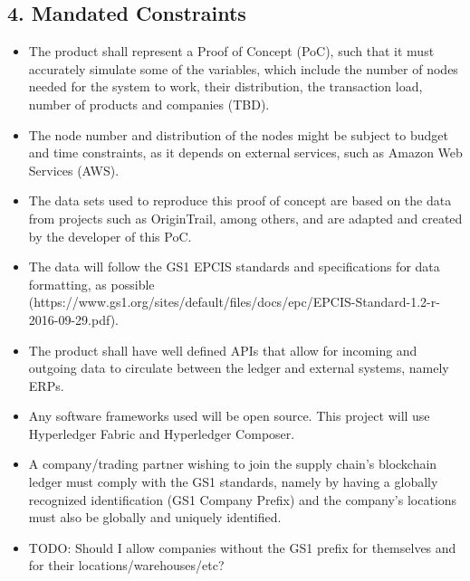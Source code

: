 \subsection*{4. Mandated Constraints}
    \begin{itemize}
		\item The product shall represent a Proof of Concept (PoC), such that it must accurately simulate some of the variables, which include the number of nodes needed for the system to work, their distribution, the transaction load, number of products and companies (TBD).
		\item The node number and distribution of the nodes might be subject to budget and time constraints, as it depends on external services, such as Amazon Web Services (AWS).
		\item The data sets used to reproduce this proof of concept are based on the data from projects such as OriginTrail, among others, and are adapted and created by the developer of this PoC.
		\item The data will follow the GS1 EPCIS standards and specifications for data formatting, as possible (https://www.gs1.org/sites/default/files/docs/epc/EPCIS-Standard-1.2-r-2016-09-29.pdf).
		\item The product shall have well defined APIs that allow for incoming and outgoing data to circulate between the ledger and external systems, namely ERPs.
		\item Any software frameworks used will be open source. This project will use Hyperledger Fabric and Hyperledger Composer.
		\item A company/trading partner wishing to join the supply chain's blockchain ledger must comply with the GS1 standards, namely by having a globally recognized identification (GS1 Company Prefix) and the company's locations must also be globally and uniquely identified.
		\item TODO: Should I allow companies without the GS1 prefix for themselves and for their locations/warehouses/etc? 
        \end{itemize}
        

